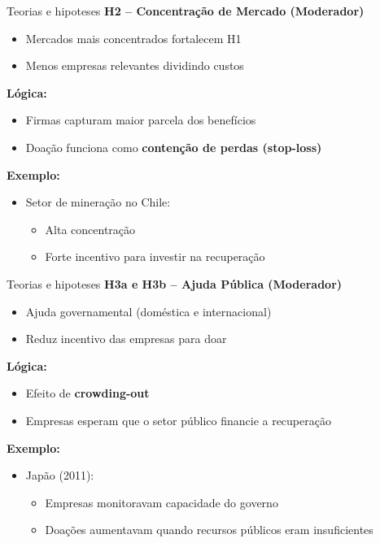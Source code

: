 \documentclass[
  10pt,
  ignorenonframetext,
  aspectratio=169,
  brazilian,
]{beamer}
\providecommand{\tightlist}{%
  \setlength{\itemsep}{0pt}\setlength{\parskip}{0pt}}
\begin{document}
\begin{frame}{Teorias e hipoteses}
\label{teorias-e-hipoteses-8}
\textbf{H2 – Concentração de Mercado (Moderador)}

\begin{itemize}
\tightlist
\item
  Mercados mais concentrados fortalecem H1
\item
  Menos empresas relevantes dividindo custos
\end{itemize}

\textbf{Lógica:}

\begin{itemize}
\tightlist
\item
  Firmas capturam maior parcela dos benefícios
\item
  Doação funciona como \textbf{contenção de perdas (stop-loss)}
\end{itemize}

\textbf{Exemplo:}

\begin{itemize}
\tightlist
\item
  Setor de mineração no Chile:

  \begin{itemize}
  \tightlist
  \item
    Alta concentração
  \item
    Forte incentivo para investir na recuperação
  \end{itemize}
\end{itemize}
\end{frame}

\begin{frame}{Teorias e hipoteses}
\label{teorias-e-hipoteses-9}
\textbf{H3a e H3b – Ajuda Pública (Moderador)}

\begin{itemize}
\tightlist
\item
  Ajuda governamental (doméstica e internacional)
\item
  Reduz incentivo das empresas para doar
\end{itemize}

\textbf{Lógica:}

\begin{itemize}
\tightlist
\item
  Efeito de \textbf{crowding-out}
\item
  Empresas esperam que o setor público financie a recuperação
\end{itemize}

\textbf{Exemplo:}

\begin{itemize}
\tightlist
\item
  Japão (2011):

  \begin{itemize}
  \tightlist
  \item
    Empresas monitoravam capacidade do governo
  \item
    Doações aumentavam quando recursos públicos eram insuficientes
  \end{itemize}
\end{itemize}
\end{frame}
\end{document}
